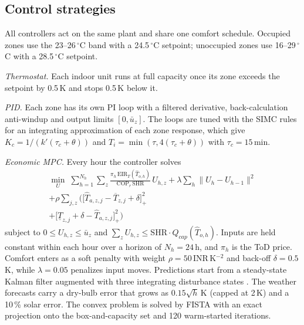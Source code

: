 \begin{table}[!t]\centering
\caption{Annual results, mean $\pm$ 95\,\% CI over five seeds. Discomfort counts
occupied overheating plus cooling-induced overcooling; $\Delta$cost is relative to the
thermostat.}\label{tab:main}
\resizebox{\textwidth}{!}{}
\end{table}

\subsection{Control strategies}
All controllers act on the same plant and share one comfort schedule. Occupied zones
use the 23--26\,$^\circ$C band \cite{nbc2005} with a 24.5\,$^\circ$C setpoint;
unoccupied zones use 16--29\,$^\circ$C with a 28.5\,$^\circ$C setpoint.

\emph{Thermostat.} Each indoor unit runs at full capacity once its zone exceeds the
setpoint by 0.5\,K and stops 0.5\,K below it.

\emph{PID.} Each zone has its own PI loop with a filtered derivative, back-calculation
anti-windup and output limits $[0,\bar u_z]$. The loops are tuned with the SIMC rules
\cite{skogestad2003} for an integrating approximation of each zone response, which give
$K_c=1/(k'(\tau_c+\theta))$ and $T_i=\min(\tau,4(\tau_c+\theta))$ with
$\tau_c=15$\,min.

\emph{Economic MPC.} Every hour the controller solves
\begin{multline}
\min_{U}\;\sum_{h=1}^{N_h}\sum_{z}
   \frac{\pi_h\,\mathrm{EIR}_T(\hat T_{o,h})}{\mathrm{COP}_r\,\mathrm{SHR}}\,U_{h,z}
 + \lambda\sum_h\|U_h-U_{h-1}\|^2\\
 +\rho\sum_{j,z}\Big(\big[\hat T_{a,z,j}-\overline T_{z,j}+\delta\big]_+^2\\
 +\big[\underline T_{z,j}+\delta-\hat T_{a,z,j}\big]_+^2\Big)
\label{eq:empc}
\end{multline}
subject to $0\le U_{h,z}\le\bar u_z$ and
$\sum_z U_{h,z}\le\mathrm{SHR}\cdot Q_{cap}(\hat T_{o,h})$. Inputs are held
constant within each hour over a horizon of $N_h=24$\,h, and $\pi_h$ is the ToD price.
Comfort enters as a soft penalty with weight $\rho=50$\,INR\,K$^{-2}$ and back-off
$\delta=0.5$\,K, while $\lambda=0.05$ penalizes input moves. Predictions start from a
steady-state Kalman filter augmented with three integrating disturbance states
\cite{pannocchia2003}. The weather forecasts carry a dry-bulb error that grows as
$0.15\sqrt{h}$\,K (capped at 2\,K) and a 10\,\% solar error. The convex problem is solved by FISTA \cite{beck2009} with an exact projection
onto the box-and-capacity set and 120 warm-started iterations.

